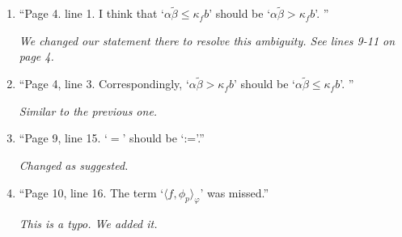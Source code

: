 \documentclass[12pt,a4paper]{amsart}
\begin{document}
	\begin{enumerate}
		\item ``Page 4. line 1. I think that `$\alpha \widetilde \beta \leq \kappa_f b$' should be `$\alpha \tilde \beta > \kappa_f b$'. ''
		
		\emph{We changed our statement there to resolve this ambiguity. See lines 9-11 on page 4.}
		
		\item ``Page 4, line 3. Correspondingly, `$\alpha \tilde \beta > \kappa_f b$' should be `$\alpha \tilde \beta \leq \kappa_f b$'. ''
		
		\emph{Similar to the previous one.}
		
		\item ``Page 9, line 15. `$=$' should be `:='.''
		
		\emph{Changed as suggested.}
		
		\item ``Page 10, line 16. The term `$\langle f, \phi_p\rangle_{\varphi}$' was missed.''
		
		\emph{This is a typo. We added it.}
	
	\end{enumerate}
\end{document}
